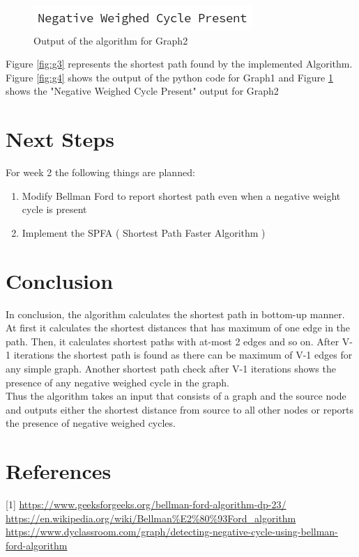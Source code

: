 \documentclass[12pt]{article}
\begin{document}
\begin{figure}[h!]
\centering
	\includegraphics[scale=1]{./Figures/w1Output2.png} 
	\caption{Output of the algorithm for Graph2}
	\label{fig:g5}
\end{figure}

Figure \ref{fig:g3} represents the shortest path found by the implemented Algorithm. \\

Figure \ref{fig:g4} shows the output of the python code for Graph1 and Figure \ref{fig:g5} shows the "Negative Weighed Cycle Present" output for Graph2
\newpage

\section{Next Steps}
For week 2 the following things are planned:
\begin{enumerate}
	\item Modify Bellman Ford to report shortest path even when a negative weight cycle is present
	\item Implement the SPFA ( Shortest Path Faster Algorithm )
\end{enumerate}

\section{Conclusion}
In conclusion, the algorithm calculates the shortest path in bottom-up manner. At first it calculates the shortest distances that has maximum of one edge in the path. Then, it calculates shortest paths with at-most 2 edges and so on. After V-1 iterations the shortest path is found as there can be maximum of V-1 edges for any simple graph. Another shortest path check after V-1 iterations shows the presence of any negative weighed cycle in the graph.  \\
Thus the algorithm takes an input that consists of a graph and the source node and outputs either the shortest distance from source to all other nodes or reports the presence of negative weighed cycles.

\section{References}
[1] \url {https://www.geeksforgeeks.org/bellman-ford-algorithm-dp-23/} \\
\noindent
[2] \url {https://en.wikipedia.org/wiki/Bellman\%E2\%80\%93Ford_algorithm} \\
\noindent
[3] \url {https://www.dyclassroom.com/graph/detecting-negative-cycle-using-bellman-ford-algorithm}
\end{document}
